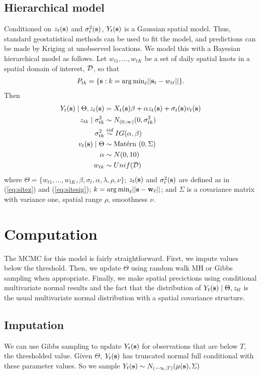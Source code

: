 \documentclass[11pt]{article}
\begin{document}
\subsection{Hierarchical model}\label{s:hier}
Conditioned on $z_t(\mbox{\bf s})$ and $\sigma^2_t(\mbox{\bf s})$, $Y_t(\mbox{\bf s})$ is a Gaussian spatial model.
Thus, standard geostatistical methods can be used to fit the model, and predictions can be made by Kriging at unobserved locations.
We model this with a Bayesian hierarchical model as follows.
Let $w_{t1}, \ldots, w_{tK}$ be a set of daily spatial knots in a spatial domain of interest, ${\cal D}$, so that
\begin{align*}
 P_{tk} = \{\mbox{\bf s} : k = {\mathop{\rm arg\, min}}_\ell || \mbox{\bf s}_t - w_{t\ell} ||\}.
\end{align*}
Then
\begin{align}
   Y_t(\mbox{\bf s}) \mid \Theta, z_{t}(\mbox{\bf s}) &= X_t(\mbox{\bf s}) \beta + \alpha z_t(\mbox{\bf s}) + \sigma
   _t(\mbox{\bf s}) v_t(\mbox{\bf s}) \label{eq:hier}\\
   z_{tk} \mid \sigma^2_{tk} &\sim N_{(0, \infty)}(0, \sigma^2_{tk})\\
   \sigma^2_{tk} &\stackrel{iid}{\sim} IG(\alpha, \beta)\\
   v_t(\mbox{\bf s}) \mid \Theta &\sim \mbox{Mat$\acute{\mbox{e}}$rn }(0, \Sigma)\\
   \alpha &\sim N(0, 10)\\
   w_{tk} &\sim Unif({\cal D})
\end{align}
where $\Theta = \{w_{t1}, \ldots, w_{tK}, \beta, \sigma_t, \alpha, \lambda, \rho, \nu \}$; $z_t(\mbox{\bf s})$ and $\sigma^2_t(\mbox{\bf s})$ are defined as in (\ref{eq:sitez}) and (\ref{eq:sitesig}); \mbox{$k = {\mathop{\rm arg\, min}}_\ell ||\mbox{\bf s} - \mbox{\bf w}_\ell ||$}; and $\Sigma$ is a \Matern covariance matrix with variance one, spatial range $\rho$, smoothness $\nu$.

\section{Computation}\label{s:comp}
The MCMC for this model is fairly straightforward.
First, we impute values below the threshold.
Then, we update $\Theta$ using random walk MH or Gibbs sampling when appropriate.
Finally, we make spatial precictions using conditional multivariate normal results and the fact that the distribution of $Y_t(\mbox{\bf s}) \mid \Theta, z_{tl}$ is the usual multivariate normal distribution with a \Matern spatial covariance structure.

\subsection{Imputation}\label{s:impute}
We can use Gibbs sampling to update $Y_t(\mbox{\bf s})$ for observations that are below $T$, the thresholded value. Given $\Theta$, $Y_t(\mbox{\bf s})$ has truncated normal full conditional with these parameter values.
So we sample $Y_t(\mbox{\bf s}) \sim N_{(-\infty, T)}(\mu(\mbox{\bf s}), \Sigma)$
\end{document}

